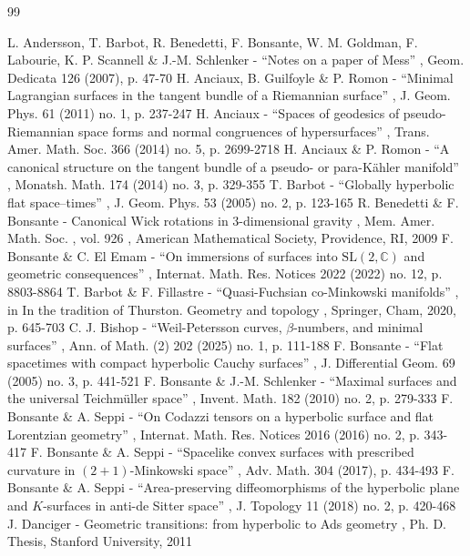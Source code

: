 \documentclass[11pt]{article}
\theoremstyle{plain}
\theoremstyle{definition}
\begin{document}
\begin{thebibliography}{99}\raggedright
{} L. Andersson, T. Barbot, R. Benedetti, F. Bonsante, W. M. Goldman, F. Labourie, K. P. Scannell \& J.-M. Schlenker - “Notes on a paper of Mess” , Geom. Dedicata 126 (2007), p. 47-70
 H. Anciaux, B. Guilfoyle \& P. Romon - “Minimal Lagrangian surfaces in the tangent bundle of a Riemannian surface” , J. Geom. Phys. 61 (2011) no. 1, p. 237-247
 H. Anciaux - “Spaces of geodesics of pseudo-Riemannian space forms and normal congruences of hypersurfaces” , Trans. Amer. Math. Soc. 366 (2014) no. 5, p. 2699-2718
 H. Anciaux \& P. Romon - “A canonical structure on the tangent bundle of a pseudo- or para-Kähler manifold” , Monatsh. Math. 174 (2014) no. 3, p. 329-355
 T. Barbot - “Globally hyperbolic flat space–times” , J. Geom. Phys. 53 (2005) no. 2, p. 123-165
 R. Benedetti \& F. Bonsante - Canonical Wick rotations in $3$-dimensional gravity , Mem. Amer. Math. Soc. , vol. 926 , American Mathematical Society, Providence, RI, 2009
 F. Bonsante \& C. El Emam - “On immersions of surfaces into $\mathrm{SL}(2,\mathbb{C})$ and geometric consequences” , Internat. Math. Res. Notices 2022 (2022) no. 12, p. 8803-8864
 T. Barbot \& F. Fillastre - “Quasi-Fuchsian co-Minkowski manifolds” , in In the tradition of Thurston. Geometry and topology , Springer, Cham, 2020, p. 645-703
 C. J. Bishop - “Weil-Petersson curves, $\beta $-numbers, and minimal surfaces” , Ann. of Math. (2) 202 (2025) no. 1, p. 111-188
 F. Bonsante - “Flat spacetimes with compact hyperbolic Cauchy surfaces” , J. Differential Geom. 69 (2005) no. 3, p. 441-521
 F. Bonsante \& J.-M. Schlenker - “Maximal surfaces and the universal Teichmüller space” , Invent. Math. 182 (2010) no. 2, p. 279-333
 F. Bonsante \& A. Seppi - “On Codazzi tensors on a hyperbolic surface and flat Lorentzian geometry” , Internat. Math. Res. Notices 2016 (2016) no. 2, p. 343-417
 F. Bonsante \& A. Seppi - “Spacelike convex surfaces with prescribed curvature in $(2+1)$-Minkowski space” , Adv. Math. 304 (2017), p. 434-493
 F. Bonsante \& A. Seppi - “Area-preserving diffeomorphisms of the hyperbolic plane and $K$-surfaces in anti-de Sitter space” , J. Topology 11 (2018) no. 2, p. 420-468
 J. Danciger - Geometric transitions: from hyperbolic to Ads geometry , Ph. D. Thesis, Stanford University, 2011

\end{thebibliography}
\end{document}
